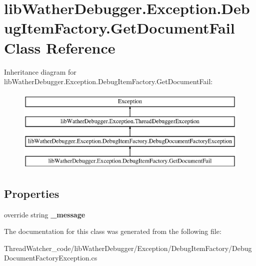 \hypertarget{classlib_wather_debugger_1_1_exception_1_1_debug_item_factory_1_1_get_document_fail}{\section{lib\+Wather\+Debugger.\+Exception.\+Debug\+Item\+Factory.\+Get\+Document\+Fail Class Reference}
\label{classlib_wather_debugger_1_1_exception_1_1_debug_item_factory_1_1_get_document_fail}
}
Inheritance diagram for lib\+Wather\+Debugger.\+Exception.\+Debug\+Item\+Factory.\+Get\+Document\+Fail\+:\begin{figure}[H]
\begin{center}
\leavevmode
\includegraphics[height=4.000000cm]{classlib_wather_debugger_1_1_exception_1_1_debug_item_factory_1_1_get_document_fail}
\end{center}
\end{figure}
\subsection*{Properties}
\begin{DoxyCompactItemize}
\item 
\hypertarget{classlib_wather_debugger_1_1_exception_1_1_debug_item_factory_1_1_get_document_fail_a6fe537b284daff006224298a1d6ff278}{override string {\bfseries \+\_\+message}}\label{classlib_wather_debugger_1_1_exception_1_1_debug_item_factory_1_1_get_document_fail_a6fe537b284daff006224298a1d6ff278}

\end{DoxyCompactItemize}


The documentation for this class was generated from the following file\+:\begin{DoxyCompactItemize}
\item 
Thread\+Watcher\+\_\+code/lib\+Wather\+Debugger/\+Exception/\+Debug\+Item\+Factory/Debug\+Document\+Factory\+Exception.\+cs\end{DoxyCompactItemize}

